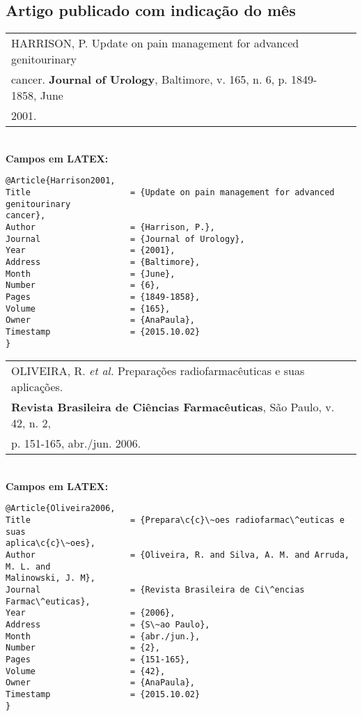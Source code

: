 \subsection{Artigo publicado com indica\c{c}\~ao do m\^es}

\begin{tabular}{|l|c|} \hline
	HARRISON, P. Update on pain management for advanced genitourinary	\\cancer. \textbf{Journal of Urology}, Baltimore, v. 165, n. 6, p. 1849-1858, June \\2001. 
	\\\hline
\end{tabular} \\

\textbf{Campos em LATEX:} 

\begin{verbatim}
@Article{Harrison2001,
Title                    = {Update on pain management for advanced 
genitourinary 
cancer},
Author                   = {Harrison, P.},
Journal                  = {Journal of Urology},
Year                     = {2001},
Address                  = {Baltimore},
Month                    = {June},
Number                   = {6},
Pages                    = {1849-1858},
Volume                   = {165},
Owner                    = {AnaPaula},
Timestamp                = {2015.10.02}
}
\end{verbatim}

\begin{tabular}{|l|c|} \hline
	OLIVEIRA, R. \textit{et al.} Prepara\c{c}\~oes radiofarmac\^euticas e suas aplica\c{c}\~oes.\\
	\textbf{Revista Brasileira de Ci\^encias Farmac\^euticas}, S\~ao Paulo, v. 42, n. 2,\\
	p. 151-165, abr./jun. 2006. \\\hline
\end{tabular} \\

\textbf{Campos em LATEX:} 

\begin{verbatim}
@Article{Oliveira2006,
Title                    = {Prepara\c{c}\~oes radiofarmac\^euticas e suas 
aplica\c{c}\~oes},
Author                   = {Oliveira, R. and Silva, A. M. and Arruda, 
M. L. and 
Malinowski, J. M},
Journal                  = {Revista Brasileira de Ci\^encias Farmac\^euticas},
Year                     = {2006},
Address                  = {S\~ao Paulo},
Month                    = {abr./jun.},
Number                   = {2},
Pages                    = {151-165},
Volume                   = {42},
Owner                    = {AnaPaula},
Timestamp                = {2015.10.02}
}
\end{verbatim}

